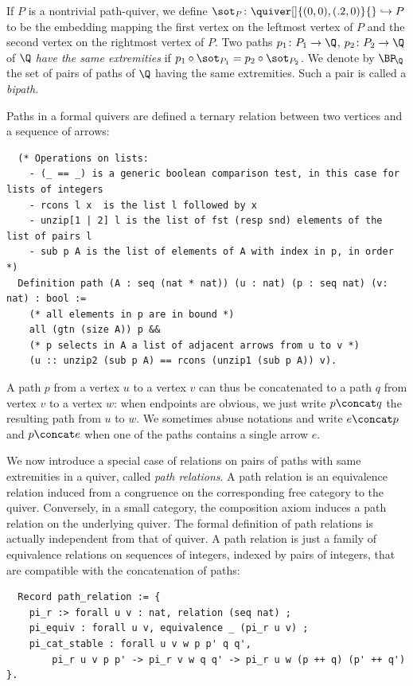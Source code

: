 \documentclass[a4paper,UKenglish,cleveref, autoref, thm-restate]{lipics-v2021}
\begin{document}
If $P$ is a nontrivial path-quiver, we define $\sot_P\colon \quiver[]{(0,0),(.2,0)}{} \hookrightarrow P$ to be the embedding mapping the first vertex on the leftmost vertex of $P$ and the second vertex on the rightmost vertex of $P$. Two paths $p_1\colon P_1 \to \Q$, $p_2\colon P_2 \to \Q$ of $\Q$ \emph{have the same extremities} if $p_1 \circ \sot_{P_1} = p_2 \circ \sot_{P_2}$. We denote by $\BP_{\!\Q}$ the set of pairs of paths of $\Q$ having the same extremities. Such a pair is called a \emph{bipath}.

Paths in a formal quivers are defined a ternary relation between two vertices and a sequence of arrows:
\begin{verbatim}
  (* Operations on lists:
    - (_ == _) is a generic boolean comparison test, in this case for lists of integers
    - rcons l x  is the list l followed by x
    - unzip[1 | 2] l is the list of fst (resp snd) elements of the list of pairs l
    - sub p A is the list of elements of A with index in p, in order *)
  Definition path (A : seq (nat * nat)) (u : nat) (p : seq nat) (v: nat) : bool :=
    (* all elements in p are in bound *)
    all (gtn (size A)) p &&
    (* p selects in A a list of adjacent arrows from u to v *)
    (u :: unzip2 (sub p A) == rcons (unzip1 (sub p A)) v).
\end{verbatim}

A path $p$ from a vertex $u$ to a vertex $v$ can thus be concatenated to a path $q$ from vertex $v$ to a vertex $w$: when endpoints are obvious, we just write $p \concat q$ the resulting path from $u$ to $w$. We sometimes abuse notations and write $e \concat p$ and $p \concat e$ when one of the paths contains a single arrow $e$.

We now introduce a special case of relations on pairs of paths with same extremities in a quiver, called \emph{path relations}. A path relation is an equivalence relation induced from a congruence on the corresponding free category to the quiver. Conversely, in a small category, the composition axiom induces a path relation on the underlying quiver. The formal definition of path relations is actually independent from that of quiver. A path relation is just a family of equivalence relations on sequences of integers, indexed by pairs of integers, that are compatible with the concatenation of paths:
\begin{verbatim}
  Record path_relation := {
    pi_r :> forall u v : nat, relation (seq nat) ;
    pi_equiv : forall u v, equivalence _ (pi_r u v) ;
    pi_cat_stable : forall u v w p p' q q',
        pi_r u v p p' -> pi_r v w q q' -> pi_r u w (p ++ q) (p' ++ q') }.
\end{verbatim}
\end{document}

